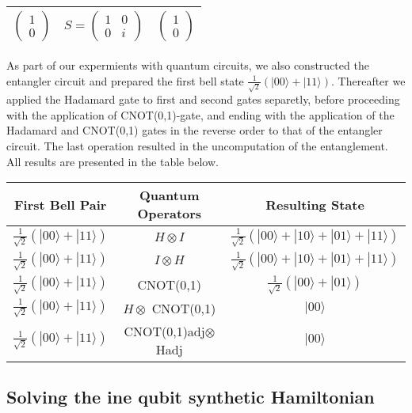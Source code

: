 \documentclass[onecolumn,10pt,cleanfoot]{asme2ej}
\begin{document}
\begin{center}
\begin{tabular}{|c|c|c|}
\hline
$\begin{pmatrix} 1 \\ 0 \end{pmatrix}$ & $S = \begin{pmatrix} 1 & 0 \\ 0 & i \end{pmatrix}$ & $\begin{pmatrix} 1 \\ 0 \end{pmatrix}$ \\
\hline
\end{tabular}
\end{center}

As part of our expermients with quantum circuits, we also constructed the entangler circuit and prepared the first bell state $\frac{1}{\sqrt{2}}(|00\rangle + |11\rangle)$. Thereafter we applied the Hadamard gate to first and second gates separetly, before proceeding with the application of CNOT(0,1)-gate, and ending with the application of the Hadamard and CNOT(0,1) gates in the reverse order to that of the entangler circuit. The last operation resulted in the uncomputation of the entanglement. All results are presented in the table below.  

\begin{center}
\begin{tabular}{|c|c|c|}
\hline
First Bell Pair & Quantum Operators & Resulting State \\
\hline
$\frac{1}{\sqrt{2}}(|00\rangle + |11\rangle)$ & $H \otimes I$ & $\frac{1}{\sqrt{2}}(|00\rangle + |10\rangle + |01\rangle + |11\rangle)$ \\
$\frac{1}{\sqrt{2}}(|00\rangle + |11\rangle)$ & $I \otimes H$ & $\frac{1}{\sqrt{2}}(|00\rangle + |10\rangle + |01\rangle + |11\rangle)$ \\
$\frac{1}{\sqrt{2}}(|00\rangle + |11\rangle)$ & CNOT(0,1) & $\frac{1}{\sqrt{2}}(|00\rangle + |01\rangle)$ \\
$\frac{1}{\sqrt{2}}(|00\rangle + |11\rangle)$ & $H \otimes$ CNOT(0,1) & $|00\rangle$ \\
$\frac{1}{\sqrt{2}}(|00\rangle + |11\rangle)$ & CNOT(0,1)adj$\otimes$Hadj & $|00\rangle$ \\
\hline
\end{tabular}
\end{center}

\subsection{Solving the ine qubit synthetic Hamiltonian} 
\end{document}
